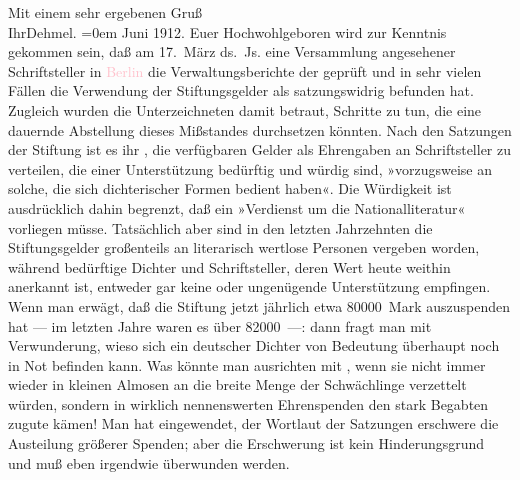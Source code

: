            \pstart
           Mit einem sehr ergebenen Gruß{\\[\baselineskip]}Ihr\spacefill\mbox{Dehmel.}\pend
           \leftskip=0em{}{\bigskip}\pstart
           \raggedleft{}{\pb}Juni
                        1912.\pend
           \pstart{}Euer Hochwohlgeboren\pend\pstart
           wird zur Kenntnis gekommen sein, daß am 17. März ds. Js.
                    eine Versammlung angesehener Schriftsteller in \textcolor{pink}{Berlin}{}\ledrightnote{\textcolor{pink}{Berlin}} die Verwaltungsberichte der \textcolor{brown}{}{}\ledrightnote{\textcolor{brown}{Deutsche Schillerstiftung}} geprüft und in
                    sehr vielen Fällen die Verwendung der Stiftungsgelder als satzungswidrig
                    befunden hat. Zugleich wurden die Unterzeichneten damit betraut, Schritte zu
                    tun, die eine dauernde Abstellung dieses Mißstandes durchsetzen könnten.\pend
           \pstart
           Nach den Satzungen der Stiftung ist es ihr ,
                    die verfügbaren Gelder als Ehrengaben an Schriftsteller zu verteilen, die einer
                    Unterstützung bedürftig und würdig sind, »vorzugsweise an solche, die sich
                    dichterischer Formen bedient haben«. Die Würdigkeit ist ausdrücklich dahin
                    begrenzt, daß ein »Verdienst um die Nationalliteratur« vorliegen müsse.
                    Tatsächlich aber sind in den letzten Jahrzehnten die Stiftungsgelder großenteils
                    an literarisch wertlose Personen vergeben worden, während bedürftige Dichter und
                    Schriftsteller, deren Wert heute weithin anerkannt ist, entweder gar keine oder
                    ungenügende Unterstützung empfingen.\pend
           \pstart
           Wenn man erwägt, daß die Stiftung jetzt jährlich etwa 80000 Mark
                    auszuspenden hat — im letzten Jahre waren es über 82000 —: dann fragt man
                    mit Verwunderung, wieso sich ein deutscher Dichter von Bedeutung überhaupt noch
                    in Not befinden kann. Was könnte man ausrichten mit , wenn sie nicht immer wieder in kleinen Almosen an
                    die breite Menge der Schwächlinge verzettelt würden, sondern in wirklich
                    nennenswerten Ehrenspenden den stark Begabten zugute kämen! Man hat eingewendet,
                    der Wortlaut der Satzungen erschwere die Austeilung größerer Spenden; aber die
                    Erschwerung ist kein Hinderungsgrund und muß eben irgendwie überwunden werden.
